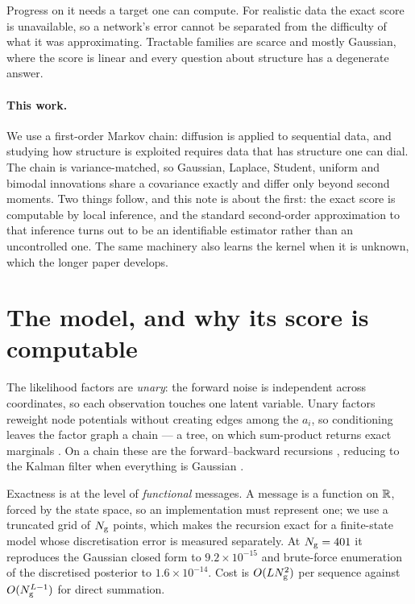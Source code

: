 \documentclass{article}
\begin{document}
Progress on it needs a target one can compute. For realistic data the exact score is unavailable,
so a network's error cannot be separated from the difficulty of what it was approximating.
Tractable families are scarce and mostly Gaussian, where the score is linear and every question
about structure has a degenerate answer.

\paragraph{This work.} We use a first-order Markov chain: diffusion is applied to sequential data,
and studying how structure is exploited requires data that has structure one can dial. The chain
is variance-matched, so Gaussian, Laplace, Student, uniform and bimodal innovations share a
covariance exactly and differ only beyond second moments. Two things follow, and this note is about
the first: the exact score is computable by local inference, and the standard second-order
approximation to that inference turns out to be an identifiable estimator rather than an
uncontrolled one. The same machinery also learns the kernel when it is unknown, which the longer
paper develops.

\section{The model, and why its score is computable}



The likelihood factors are \emph{unary}: the forward noise is independent across coordinates, so
each observation touches one latent variable. Unary factors reweight node potentials without
creating edges among the $a_i$, so conditioning leaves the factor graph a chain --- a tree, on
which sum-product returns exact marginals \citep{pearl1988,kschischang2001,mezard2009}. On a chain
these are the forward--backward recursions \citep{baum1970,rabiner1989}, reducing to the Kalman
filter when everything is Gaussian \citep{kalman1960,rauch1965}.

Exactness is at the level of \emph{functional} messages. A message is a function on $\mathbb{R}$,
forced by the state space, so an implementation must represent one; we use a truncated grid of
$N_{\mathrm{g}}$ points, which makes the recursion exact for a finite-state model whose discretisation
error is measured separately. At $N_{\mathrm{g}}=401$ it reproduces the Gaussian closed form to
$9.2\times10^{-15}$ and brute-force enumeration of the discretised posterior to
$1.6\times10^{-14}$. Cost is $O(LN_{\mathrm{g}}^{2})$ per sequence against $O(N_{\mathrm{g}}^{L-1})$
for direct summation.
\end{document}

